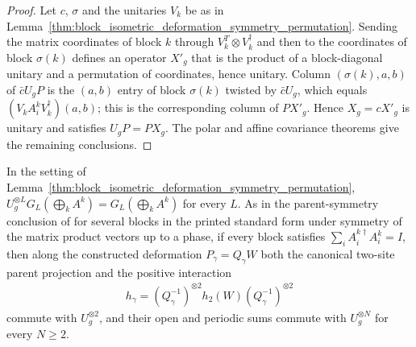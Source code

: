 \begin{proof}
    \leanok
    Let $c$, $\sigma$ and the unitaries $V_k$ be as in
    Lemma~\ref{thm:block_isometric_deformation_symmetry_permutation}.
    Sending the matrix coordinates of block $k$ through
    $V_k^T\otimes V_k^\dagger$ and then to the coordinates of block
    $\sigma(k)$ defines an operator $X'_g$ that is the product of a
    block-diagonal unitary and a permutation of coordinates, hence unitary.
    Column $(\sigma(k),a,b)$ of $\bar cU_gP$ is the $(a,b)$ entry of block
    $\sigma(k)$ twisted by $\bar cU_g$, which equals
    $(V_kA^k_iV_k^\dagger)(a,b)$; this is the corresponding column of $PX'_g$.
    Hence $X_g=cX'_g$ is unitary and satisfies $U_gP=PX_g$. The polar and
    affine covariance theorems give the remaining conclusions.
\end{proof}

\begin{lemma}
    \label{thm:block_isometric_deformation_parent_symmetry}
    \leanok
    In the setting of
    Lemma~\ref{thm:block_isometric_deformation_symmetry_permutation},
    $U_g^{\otimes L}G_L(\bigoplus_kA^k)=G_L(\bigoplus_kA^k)$ for every
    $L$. As in the parent-symmetry conclusion of
    \cite[lines~672--676]{Schuch2011Phases} for several blocks in the printed
    standard form under symmetry of the matrix product vectors up to a phase,
    if every block satisfies $\sum_iA^{k\dagger}_iA^k_i=I$, then along the
    constructed deformation $P_\gamma=Q_\gamma W$ both the canonical two-site
    parent projection and the positive interaction
    \begin{align*}
        h_\gamma=(Q_\gamma^{-1})^{\otimes2}
        h_2(W)(Q_\gamma^{-1})^{\otimes2}
    \end{align*}
    commute with $U_g^{\otimes2}$, and their open and periodic sums
    commute with $U_g^{\otimes N}$ for every $N\geq2$.
\end{lemma}

